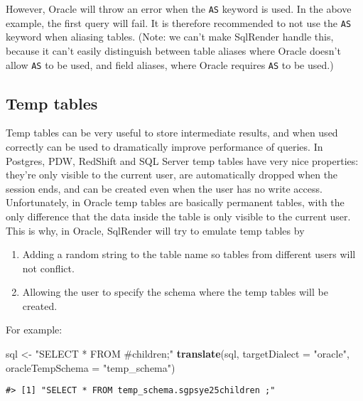 \documentclass[
]{article}
\newenvironment{Shaded}{\begin{snugshade}}{\end{snugshade}}
\newcommand{\DataTypeTok}[1]{\textcolor[rgb]{0.13,0.29,0.53}{#1}}
\newcommand{\KeywordTok}[1]{\textcolor[rgb]{0.13,0.29,0.53}{\textbf{#1}}}
\newcommand{\NormalTok}[1]{#1}
\newcommand{\StringTok}[1]{\textcolor[rgb]{0.31,0.60,0.02}{#1}}
\providecommand{\tightlist}{%
  \setlength{\itemsep}{0pt}\setlength{\parskip}{0pt}}
\begin{document}
However, Oracle will throw an error when the \texttt{AS} keyword is
used. In the above example, the first query will fail. It is therefore
recommended to not use the \texttt{AS} keyword when aliasing tables.
(Note: we can't make SqlRender handle this, because it can't easily
distinguish between table aliases where Oracle doesn't allow \texttt{AS}
to be used, and field aliases, where Oracle requires \texttt{AS} to be
used.)

\hypertarget{temp-tables}{%
\subsection{Temp tables}\label{temp-tables}}

Temp tables can be very useful to store intermediate results, and when
used correctly can be used to dramatically improve performance of
queries. In Postgres, PDW, RedShift and SQL Server temp tables have very
nice properties: they're only visible to the current user, are
automatically dropped when the session ends, and can be created even
when the user has no write access. Unfortunately, in Oracle temp tables
are basically permanent tables, with the only difference that the data
inside the table is only visible to the current user. This is why, in
Oracle, SqlRender will try to emulate temp tables by

\begin{enumerate}
\def\labelenumi{\arabic{enumi}.}
\tightlist
\item
  Adding a random string to the table name so tables from different
  users will not conflict.
\item
  Allowing the user to specify the schema where the temp tables will be
  created.
\end{enumerate}

For example:

\begin{Shaded}
\begin{Highlighting}[]
\NormalTok{sql <-}\StringTok{ "SELECT * FROM #children;"}
\KeywordTok{translate}\NormalTok{(sql, }\DataTypeTok{targetDialect =} \StringTok{"oracle"}\NormalTok{, }\DataTypeTok{oracleTempSchema =} \StringTok{"temp_schema"}\NormalTok{)}
\end{Highlighting}
\end{Shaded}

\begin{verbatim}
#> [1] "SELECT * FROM temp_schema.sgpsye25children ;"
\end{verbatim}
\end{document}
